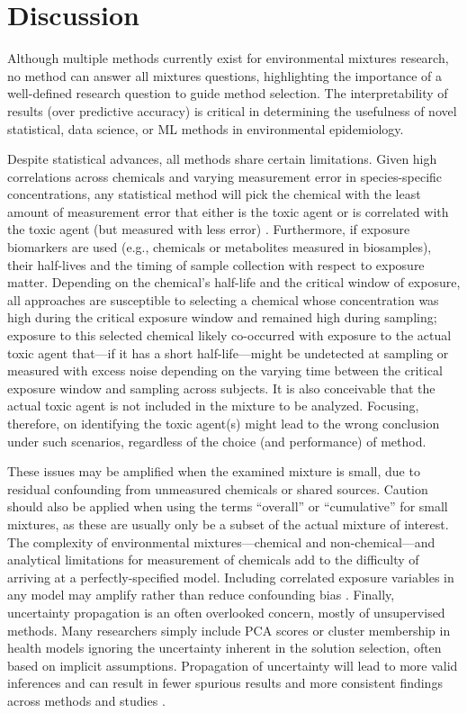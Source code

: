 \section{Discussion}\label{sec:Discuss}

Although multiple methods currently exist for environmental mixtures research, no method can answer all mixtures questions, highlighting the importance of a well-defined research question to guide method selection. The interpretability of results (over predictive accuracy) is critical in determining the usefulness of novel statistical, data science, or ML methods in environmental epidemiology.

Despite statistical advances, all methods share certain limitations. Given high correlations across chemicals and varying measurement error in species-specific concentrations, any statistical method will pick the chemical with the least amount of measurement error that either is the toxic agent or is correlated with the toxic agent (but measured with less error) \citep{carroll2006measurement, pollack2012correlated}. Furthermore, if exposure biomarkers are used (e.g., chemicals or metabolites measured in biosamples), their half-lives and the timing of sample collection with respect to exposure matter. Depending on the chemical’s half-life and the critical window of exposure, all approaches are susceptible to selecting a chemical whose concentration was high during the critical exposure window and remained high during sampling; exposure to this selected chemical likely co-occurred with exposure to the actual toxic agent that---if it has a short half-life---might be undetected at sampling or measured with excess noise depending on the varying time between the critical exposure window and sampling across subjects. It is also conceivable that the actual toxic agent is not included in the mixture to be analyzed. Focusing, therefore, on identifying the toxic agent(s) might lead to the wrong conclusion under such scenarios, regardless of the choice (and performance) of method.

These issues may be amplified when the examined mixture is small, due to residual confounding from unmeasured chemicals or shared sources. Caution should also be applied when using the terms ``overall'' or ``cumulative'' for small mixtures, as these are usually only be a subset of the actual mixture of interest. The complexity of environmental mixtures---chemical and non-chemical---and analytical limitations for measurement of chemicals add to the difficulty of arriving at a perfectly-specified model. Including correlated exposure variables in any model may amplify rather than reduce confounding bias \citep{weisskopf2018bias}. Finally, uncertainty propagation is an often overlooked concern, mostly of unsupervised methods. Many researchers simply include PCA scores or cluster membership in health models ignoring the uncertainty inherent in the solution selection, often based on implicit assumptions. Propagation of uncertainty will lead to more valid inferences and can result in fewer spurious results and more consistent findings across methods and studies \citep{mak14_unc}.

